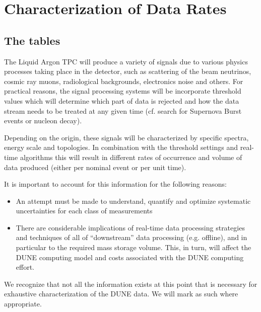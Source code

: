 \chapter{Characterization of Data Rates}
\label{ch:annex-rate}

\section{The tables}

The Liquid Argon TPC will produce a variety of signals due to various
physics processes taking place in the detector, such as scattering of
the beam neutrinos, cosmic ray muons, radiological backgrounds,
electronics noise and others.
For practical reasons, the signal processing systems will be
incorporate threshold values which will determine which part of data
is rejected and how the data stream needs to be treated at any given
time (cf. search for Supernova Burst events or nucleon decay).

Depending on the origin, these signals will be characterized by
specific spectra, energy scale and topologies.
In combination with the threshold settings and real-time algorithms
this will result in different rates of occurrence and volume of data
produced (either per nominal event or per unit time).

It is important to account for this information for the following reasons:
\begin{itemize}
\item An attempt must be made to understand, quantify and optimize
  systematic uncertainties for each class of measurements
\item There are considerable implications of real-time data processing
  strategies and techniques of all of ``downstream'' data processing
  (e.g. offline), and in particular to the required mass storage
  volume.
  This, in turn, will affect the DUNE computing model and costs
  associated with the DUNE computing effort.
\end{itemize}


We recognize that not all the information exists at this point that is
necessary for exhaustive characterization of the DUNE data.
We will mark as such where appropriate.


